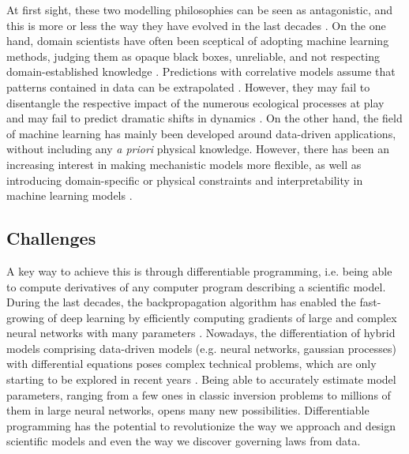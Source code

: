 At first sight, these two modelling philosophies can be seen as antagonistic, and this is more or less the way they have evolved in the last decades \cite{zdeborova_understanding_2020}. 
On the one hand, domain scientists have often been sceptical of adopting machine learning methods, judging them as opaque black boxes, unreliable, and not respecting domain-established knowledge \cite{Coveney:2016eb}. Predictions with correlative models assume that patterns contained in data can be extrapolated \cite{dormann2007}. However, they may fail to disentangle the respective impact of the numerous ecological processes at play and may fail to predict dramatic shifts in dynamics \cite{Barnosky2012}.
On the other hand, the field of machine learning has mainly been developed around data-driven applications, without including any \textit{a priori} physical knowledge. 
However, there has been an increasing interest in making mechanistic models more flexible, as well as introducing domain-specific or physical constraints and interpretability in machine learning models \cite{Molnar.2020sisk,Rudin.2022,Schneider2017,rasp2018,Yazdani2020,Abarbanel2018,Carrassi2018,Bocquet2019,Gabor2015,Gharamti2017,Curtsdotter2019,Rosenbaum2019,Toms2020,Brajard2021}.


\subsection{Challenges}


A key way to achieve this is through differentiable programming, i.e. being able to compute derivatives of any computer program describing a scientific model.
During the last decades, the backpropagation algorithm has enabled the fast-growing of deep learning by efficiently computing gradients of large and complex neural networks with many parameters \cite{griewank2012invented}.
Nowadays, the differentiation of hybrid models comprising data-driven models (e.g. neural networks, gaussian processes) with differential equations poses complex technical problems, which are only starting to be explored in recent years \cite{ma_comparison_2021}. 
Being able to accurately estimate model parameters, ranging from a few ones in classic inversion problems to millions of them in large neural networks, opens many new possibilities. 
Differentiable programming has the potential to revolutionize the way we approach and design scientific models and even the way we discover governing laws from data. 

